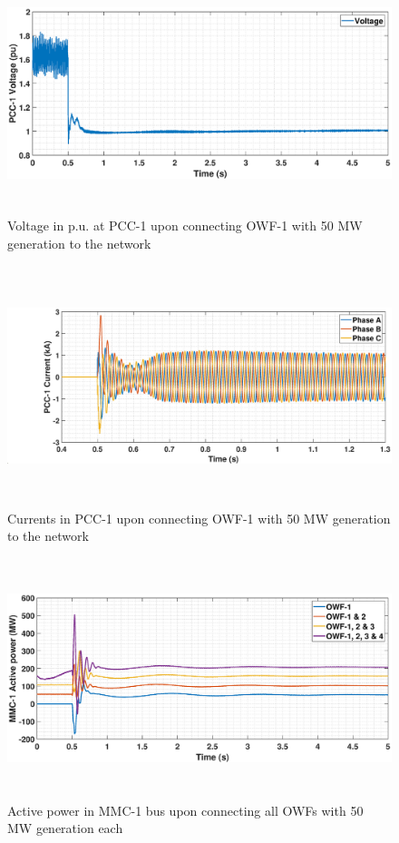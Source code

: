 \begin{figure}[H]
    \includegraphics[height = 7cm,width = \textwidth]{Diagrams/Chapter_5/VACP_WT1_WT1connect.eps}
    \caption{Voltage in p.u. at PCC-1 upon connecting OWF-1 with 50 MW generation to the network}
    \label{VACP_WT1_WT1connect}
\end{figure}

\begin{figure}[H]
    \includegraphics[height = 7cm,width = \textwidth]{Diagrams/Chapter_5/IABC_WT1_WT1connect.eps}
    \caption{Currents in PCC-1 upon connecting OWF-1 with 50 MW generation to the network}
    \label{IABC_WT1_WT1connect}
\end{figure}

\begin{figure}[H]
    \includegraphics[height = 7cm,width = \textwidth]{Diagrams/Chapter_5/P_MMC_1_WT1234connect.eps}
    \caption{Active power in MMC-1 bus upon connecting all OWFs with 50 MW generation each}
    \label{P_MMC_1_WT1234connect}
\end{figure}

